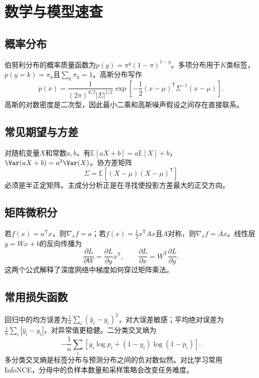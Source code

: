 \chapter{数学与模型速查}

\section{概率分布}
伯努利分布的概率质量函数为$p(y)=\pi^y(1-\pi)^{1-y}$。多项分布用于$K$类标签，$p(y=k)=\pi_k$且$\sum_k\pi_k=1$。高斯分布写作
\begin{equation}
 p(x)=\frac{1}{(2\pi)^{d/2}|\Sigma|^{1/2}}
 \exp\left[-\frac12(x-\mu)^{\mathsf T}\Sigma^{-1}(x-\mu)\right].
\end{equation}
高斯的对数密度是二次型，因此最小二乘和高斯噪声假设之间存在直接联系。

\section{常见期望与方差}
对随机变量$X$和常数$a,b$，有$\mathbb{E}[aX+b]=a\mathbb{E}[X]+b$，$\Var(aX+b)=a^2\Var(X)$。协方差矩阵
\begin{equation}
 \Sigma=\mathbb{E}[(X-\mu)(X-\mu)^{\mathsf T}]
\end{equation}
必须是半正定矩阵。主成分分析正是在寻找使投影方差最大的正交方向。

\section{矩阵微积分}
若$f(x)=a^{\mathsf T}x$，则$\nabla_xf=a$；若$f(x)=\frac12x^{\mathsf T}Ax$且$A$对称，则$\nabla_xf=Ax$。线性层$y=Wx+b$的反向传播为
\begin{equation}
 \frac{\partial L}{\partial W}=\frac{\partial L}{\partial y}x^{\mathsf T},
 \qquad
 \frac{\partial L}{\partial x}=W^{\mathsf T}\frac{\partial L}{\partial y}.
\end{equation}
这两个公式解释了深度网络中梯度如何穿过矩阵乘法。

\section{常用损失函数}
回归中的均方误差为$\frac1n\sum_i(\hat y_i-y_i)^2$，对大误差敏感；平均绝对误差为$\frac1n\sum_i|\hat y_i-y_i|$，对异常值更稳健。二分类交叉熵为
\begin{equation}
 -\frac1n\sum_i[y_i\log p_i+(1-y_i)\log(1-p_i)].
\end{equation}
多分类交叉熵是标签分布与预测分布之间的负对数似然。对比学习常用 InfoNCE，分母中的负样本数量和采样策略会改变任务难度。

